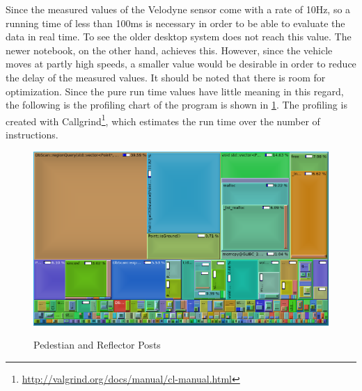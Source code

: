 \documentclass[11pt,oneside,openright]{mpreport}
\begin{document}
Since the measured values of the Velodyne sensor come with a rate of 10Hz, so a running time of less than 100ms is necessary in order to be able to evaluate the data 
in real time. To see the older desktop system does not reach this value. The newer notebook, on the other hand, achieves this. 
However, since the vehicle moves at partly high speeds, a smaller value would be desirable in order to reduce the delay of the measured values. 
It should be noted that there is room for optimization. Since the pure run time values have little meaning in this regard, 
the following is the profiling chart of the program is shown in \cref{profiling}. 
The profiling is created with Callgrind\footnote{\url{http://valgrind.org/docs/manual/cl-manual.html}}, which estimates the run time over the number of instructions.


\begin{figure}[!htb]
  \caption{Pedestian and Reflector Posts} 
  \centering
  \includegraphics[width=\textwidth]{bilder/call.png}
 \label{profiling}
\end{figure}
\end{document}
